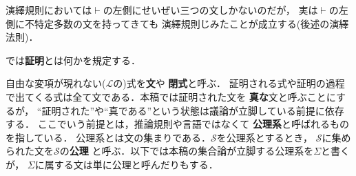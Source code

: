 	演繹規則においては$\vdash$の左側にせいぜい三つの文しかないのだが，
	実は$\vdash$の左側に不特定多数の文を持ってきても
	演繹規則じみたことが成立する(後述の演繹法則)．
	
	では{\bf 証明}とは何かを規定する．
	
	自由な変項が現れない($\mathcal{L}$の)式を{\bf 文}や
	{\bf 閉式}と呼ぶ．
	証明される式や証明の過程で出てくる式は全て文である．本稿では証明された文を
	{\bf 真な}文と呼ぶことにするが，
	``証明された''や``真である''という状態は議論が立脚している前提に依存する．
	ここでいう前提とは，推論規則や言語ではなくて
	{\bf 公理系}と呼ばれるものを指している．
	公理系とは文の集まりである．$\mathscr{S}$を公理系とするとき，
	$\mathscr{S}$に集められた文を$\mathscr{S}$の{\bf 公理}
	と呼ぶ．以下では本稿の集合論が立脚する公理系を$\Sigma$と書くが，
	$\Sigma$に属する文は単に公理と呼んだりもする．
	
